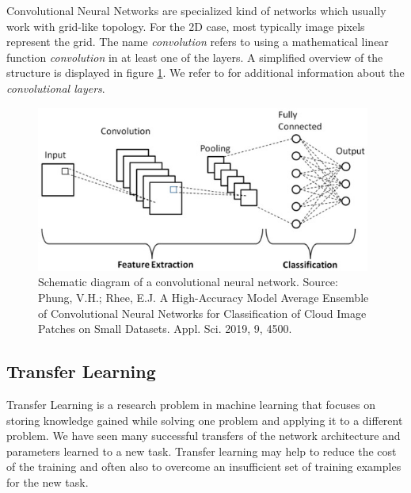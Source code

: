 Convolutional Neural Networks are specialized kind of networks which usually work with grid-like topology. For the 2D case, most typically image pixels represent the grid. The name \emph{convolution} refers to using a mathematical linear function \emph{convolution} in at least one of the layers. A simplified overview of the structure is displayed in figure \ref{fig:convolution_neural_network}. We refer to \cite{Goodfellow-et-al-2016} for additional information about the \emph{convolutional layers}.

\begin{figure}
    \centering
    \includegraphics[width=0.98\textwidth]{img/convolution_neural_network.jpg}
    \caption[Schematic diagram of a convolutional neural network]{Schematic diagram of a convolutional neural network. Source: Phung, V.H.; Rhee, E.J. A High-Accuracy Model Average Ensemble of Convolutional Neural Networks for Classification of Cloud Image Patches on Small Datasets. Appl. Sci. 2019, 9, 4500.}
    \label{fig:convolution_neural_network}
\end{figure}

\subsection{Transfer Learning}

Transfer Learning is a research problem in machine learning that focuses on storing knowledge gained while solving one problem and applying it to a different problem. We have seen many successful transfers of the network architecture and parameters learned to a new task. Transfer learning may help to reduce the cost of the training and often also to overcome an insufficient set of training examples for the new task.

